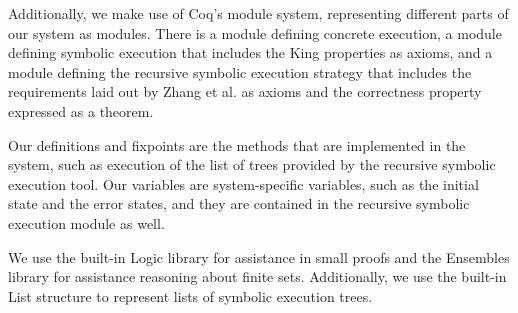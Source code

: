 
 

Additionally, we make use of Coq's module system, representing different parts of our system as modules.  There is a module defining concrete execution, a module defining symbolic execution that includes the King properties as axioms, and a module defining the recursive symbolic execution strategy that includes the requirements laid out by Zhang et al. as axioms and the correctness property expressed as a theorem.

Our definitions and fixpoints are the methods that are implemented
in the system, such as execution of the list of trees provided by the recursive
symbolic execution tool. Our variables are system-specific variables, such as the
initial state and the error states, and they are contained in the recursive symbolic execution module as well.

We use the built-in Logic library for assistance in small proofs and the Ensembles library for assistance reasoning about finite sets. Additionally, we use the built-in List structure to represent lists of symbolic execution trees.









